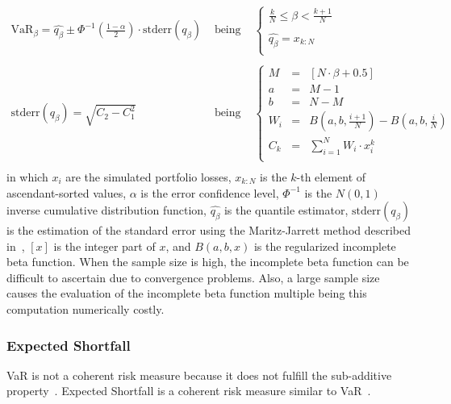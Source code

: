 \documentclass[11pt,fleqn]{book} %
\begin{document}
\begin{displaymath}
	\begin{array}{lcl}
		\textrm{VaR}_{\beta} = \widehat{q_{\beta}} \pm \Phi^{-1}\left(\frac{1-\alpha}{2}\right) \cdot \textrm{stderr}(q_{\beta})
		& \text{ being } &
		\left\{
		\begin{array}{l}
			\displaystyle
			\frac{k}{N} \leq \beta < \frac{k+1}{N} \\
			\\
			\displaystyle
			\widehat{q_{\beta}} = x_{k:N} \\
		\end{array}
		\right.
		\\
		& &
		\\
		\textrm{stderr}(q_{\beta}) = \sqrt{C_2 - C_1^2}
		& \text{ being } &
		\left\{
		\begin{array}{rcl}
			M   & = & [N \cdot \beta + 0.5]  \\
			a   & = & M - 1            \\
			b   & = & N - M            \\
			W_i & = & B(a,b,\frac{i+1}{N}) - B(a,b,\frac{i}{N}) \\
			C_k & = & \sum_{i=1}^{N} W_i \cdot x_i^k \\
		\end{array}
		\right.
		\\
	\end{array}
\end{displaymath}
in which $x_i$ are the simulated portfolio losses, $x_{k:N}$ is the $k$-th 
element of ascendant-sorted values, $\alpha$ is the error confidence level, 
$\Phi^{-1}$ is the $N(0,1)$ inverse cumulative distribution function, 
$\widehat{q_{\beta}}$ is the quantile estimator, $\textrm{stderr}(q_{\beta})$ 
is the estimation of the standard error using the Maritz-Jarrett method 
described in~\cite[chap. 3.5.3]{wilcox:2004}, $[x]$ is the integer part of 
$x$, and $B(a,b,x)$ is the regularized incomplete beta function.
When the sample size is high, the incomplete beta function can be difficult 
to ascertain due to convergence problems. Also, a large sample size causes 
the evaluation of the incomplete beta function multiple being this computation
numerically costly.

\subsubsection{Expected Shortfall}

VaR is not a coherent risk measure because it does not fulfill the 
sub-additive property~\cite{var:varbad}. Expected Shortfall is a coherent 
risk measure similar to VaR~\cite{var:eshortfall}.
\end{document}
